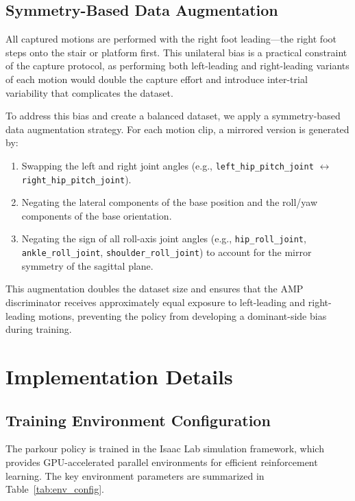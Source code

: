\subsection{Symmetry-Based Data Augmentation}
\label{sec:data_augmentation}

All captured motions are performed with the right foot leading---the right foot steps onto the stair or platform first. This unilateral bias is a practical constraint of the capture protocol, as performing both left-leading and right-leading variants of each motion would double the capture effort and introduce inter-trial variability that complicates the dataset.

To address this bias and create a balanced dataset, we apply a symmetry-based data augmentation strategy. For each motion clip, a mirrored version is generated by:
\begin{enumerate}
    \item Swapping the left and right joint angles (e.g., \texttt{left\_hip\_pitch\_joint} $\leftrightarrow$ \texttt{right\_hip\_pitch\_joint}).
    \item Negating the lateral components of the base position and the roll/yaw components of the base orientation.
    \item Negating the sign of all roll-axis joint angles (e.g., \texttt{hip\_roll\_joint}, \texttt{ankle\_roll\_joint}, \texttt{shoulder\_roll\_joint}) to account for the mirror symmetry of the sagittal plane.
\end{enumerate}

This augmentation doubles the dataset size and ensures that the AMP discriminator receives approximately equal exposure to left-leading and right-leading motions, preventing the policy from developing a dominant-side bias during training.

\section{Implementation Details}
\label{sec:implementation_notes}

\subsection{Training Environment Configuration}
\label{sec:ch6_env_config}

The parkour policy is trained in the Isaac Lab simulation framework, which provides GPU-accelerated parallel environments for efficient reinforcement learning. The key environment parameters are summarized in Table~\ref{tab:env_config}.

